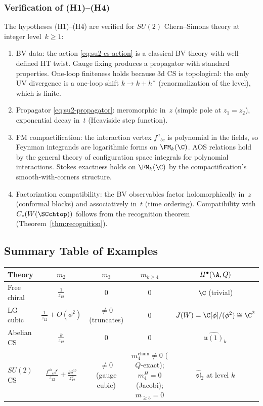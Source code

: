 \subsubsection{Verification of (H1)--(H4)}

\begin{proposition}
The hypotheses \textrm{(H1)--(H4)} are verified for $SU(2)$
Chern--Simons theory at integer level~$k \geq 1$:
\begin{enumerate}[label=\textup{(H\arabic*)}]
\item BV data: the action \eqref{eq:su2-cs-action} is a
 classical BV theory with well-defined HT twist. Gauge fixing
 produces a propagator with standard properties. One-loop
 finiteness holds because 3d CS is topological: the only
 UV divergence is a one-loop shift $k \to k + h^\vee$
 (renormalization of the level), which is finite.
\item Propagator \eqref{eq:su2-propagator}: meromorphic in~$z$
 (simple pole at $z_1 = z_2$), exponential decay in~$t$
 (Heaviside step function).
\item FM compactification: the interaction vertex $f^a{}_{bc}$
 is polynomial in the fields, so Feynman integrands are
 logarithmic forms on $\FM_k(\C)$. AOS relations hold by the
 general theory of configuration space integrals for
 polynomial interactions. Stokes exactness holds on
 $\FM_k(\C)$ by the compactification's smooth-with-corners
 structure.
\item Factorization compatibility: the BV observables factor
 holomorphically in~$z$ (conformal blocks) and associatively
 in~$t$ (time ordering). Compatibility with
 $C_\ast(W(\SCchtop))$ follows from the recognition theorem
 (Theorem~\ref{thm:recognition}).
\end{enumerate}
\end{proposition}

\subsection{Summary Table of Examples}

\begin{center}
\begin{tabular}{|l|c|c|c|c|}
\hline
\textbf{Theory} & $m_2$ & $m_3$ & $m_{k \geq 4}$ & $H^\bullet(\A, Q)$ \\
\hline
Free chiral & $\frac{1}{z_{12}}$ & $0$ & $0$ & $\C$ (trivial) \\
\hline
LG cubic & $\frac{1}{z_{12}} + O(\phi^2)$ & $\neq 0$ (truncates) & $0$ & $J(W) = \C[\phi]/(\phi^2) \cong \C^2$ \\
\hline
Abelian CS & $\frac{k}{z_{12}}$ & $0$ & $0$ & $\widehat{\mathfrak{u}(1)}_k$ \\
\hline
$SU(2)$ CS & $\frac{f^{ab}{}_c J^c}{z_{12}} + \frac{k\delta^{ab}}{z_{12}^2}$ & $\neq 0$ (gauge cubic) & $m_4^{\mathrm{chain}} \neq 0$ ($Q$-exact); $m_4^H = 0$ (Jacobi); $m_{\geq 5} = 0$ & $\widehat{\mathfrak{sl}}_2$ at level $k$ \\
\hline
\end{tabular}
\end{center}

